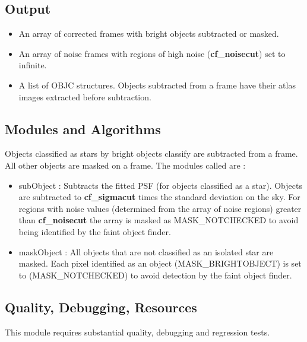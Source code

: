 \subsection{Output}
 
\begin{itemize}
 
\item An array of corrected frames with bright objects subtracted or masked.
 
\item An array of noise frames with regions of high noise 
({\bf cf\_noisecut}) set to infinite.
 
\item A list of OBJC structures. Objects subtracted from a frame have their
atlas images extracted before subtraction.
 
\end{itemize}
 
\subsection{Modules and Algorithms}
 
Objects classified as stars by bright objects classify are subtracted
from a frame. All other objects are masked on a frame. The modules 
called are :
 
\begin{itemize}
 
\item subObject : Subtracts the fitted PSF (for objects classified as a 
star). Objects are subtracted to {\bf cf\_sigmacut} times the standard 
deviation on the sky. For regions with noise values (determined from
the array of noise regions) greater than {\bf cf\_noisecut} the array
is masked as MASK\_NOTCHECKED to avoid being identified by the faint
object finder.
 
\item maskObject : All objects that are not classified as an isolated star
are masked. Each pixel identified as an object (MASK\_BRIGHTOBJECT) is
set to (MASK\_NOTCHECKED) to avoid detection by the faint object finder.
 
\end{itemize}
 
 
\subsection{Quality, Debugging, Resources}
 
This module requires substantial quality, debugging and regression tests.
 
